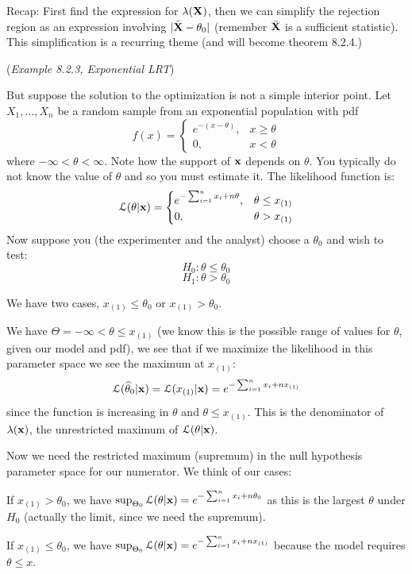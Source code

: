 \documentclass[11pt,]{article}
\def\bx{{\bf x}}
\def\bX{{\bf X}}
\def\thetahat{{\widehat\theta}}
\def\bXbar{\bar{ \bX}}
\def\Lsc{{\cal L}}
\def\sumin{\sum_{i=1}^n}
\begin{document}
Recap: First find the expression for \(\lambda(\bX)\), then we can
simplify the rejection region as an expression involving
\(|\bXbar - \theta_0|\) (remember \(\bXbar\) is a sufficient statistic).
This simplification is a recurring theme (and will become theorem
8.2.4.)

 (\emph{Example 8.2.3, Exponential LRT})

But suppose the solution to the optimization is not a simple interior
point. Let \(X_1, \ldots, X_n\) be a random sample from an exponential
population with pdf \[f(x) = 
\begin{cases}
e^{-(x-\theta)},& x\geq \theta\\
0, & x<\theta
\end{cases}
\] where \(-\infty < \theta < \infty\). Note how the support of \(\bx\)
depends on \(\theta\). You typically do not know the value of \(\theta\)
and so you must estimate it. The likelihood function is:
\[\Lsc(\theta |\bx) = \begin{cases}
e^{-\sumin x_i + n \theta}, & \theta \leq x_{(1)}\\
0, & \theta > x_{(1)}
\end{cases}
\] Now suppose you (the experimenter and the analyst) choose a
\(\theta_0\) and wish to test: \[H_0: \theta \leq \theta_0\]
\[H_1: \theta > \theta_0\]

We have two cases, \(x_{(1)} \leq \theta_0\) or \(x_{(1)} > \theta_0\).

We have \(\Theta = {-\infty < \theta \leq x_{(1)} }\) (we know this is
the possible range of values for \(\theta\), given our model and pdf),
we see that if we maximize the likelihood in this parameter space we see
the maximum at \(x_{(1)}\):
\[\Lsc(\thetahat_0 |\bx) = \Lsc(x_{(1)}|\bx) = e^{-\sumin x_i + nx_{(1)}}\]
since the function is increasing in \(\theta\) and
\(\theta \leq x_{(1)}\). This is the denominator of \(\lambda(\bx)\),
the unrestricted maximum of \(\Lsc(\theta | \bx)\).

Now we need the restricted maximum (supremum) in the null hypothesis
parameter space for our numerator. We think of our cases:

If \(x_{(1)} > \theta_0\), we have
\(\sup_{\Theta_0} \Lsc(\theta|\bx) = e^{-\sumin x_i+ n\theta_0}\) as
this is the largest \(\theta\) under \(H_0\) (actually the limit, since
we need the supremum).

If \(x_{(1)} \leq \theta_0\), we have
\(\sup_{\Theta_0} \Lsc(\theta | \bx) = e^{-\sumin x_i + n x_{(1)}}\)
because the model requires \(\theta \leq x\).
\end{document}
